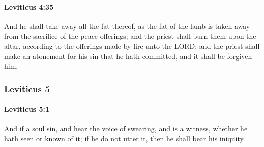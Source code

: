 		\paragraph{Leviticus 4:35} %
			\label{LEVITICUS-4-35}

			And he shall take away all the fat thereof, as the fat of the lamb is taken away from the sacrifice of the peace offerings; and the priest shall burn them upon the altar, according to the offerings made by fire unto the LORD: and the priest shall make an atonement for his sin that he hath committed, and it shall be forgiven him.

	\subsubsection{Leviticus 5} %
		\label{LEVITICUS-5}

		\paragraph{Leviticus 5:1} %
			\label{LEVITICUS-5-1}

			And if a soul sin, and hear the voice of swearing, and is a witness, whether he hath seen or known of it; if he do not utter it, then he shall bear his iniquity.

